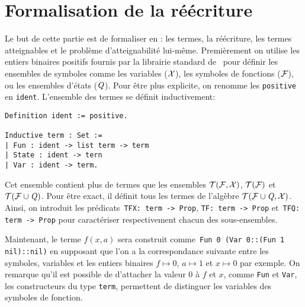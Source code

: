 \section{Formalisation de la réécriture}
\label{sec:rewriting}

Le but de cette partie est de formaliser en \coq: les termes, la
réécriture, les termes atteignables et le problème d'atteignabilité
lui-même.  Premièrement on utilise les entiers binaires positifs
fournis par la librairie standard de \coq\ pour définir les ensembles de
symboles comme les variables ($\mathcal X$), les symboles de fonctions
($\mathcal{F}$), ou les ensembles d'états ($\mathit Q$). 
Pour être plus explicite, on renomme les \lstinline!positive!
en \lstinline!ident!. L'ensemble des termes se définit inductivement:

\switchlstcoq
\begin{lstlisting}
Definition ident := positive.

Inductive term : Set :=
| Fun : ident -> list term -> term
| State : ident -> tern
| Var : ident -> term.
\end{lstlisting}

Cet ensemble contient plus de termes que les ensembles $\mathcal{T(F, X)}$, $\mathcal{T(F)}$ et $\mathcal{ T(F \cup \mathit Q)}$.
Pour être exact, il définit tous les termes de l'algèbre $\mathcal{ T(F \cup \mathit Q, X)}$.
Ainsi, on introduit les prédicats~\lstinline!TFX: term -> Prop!, \lstinline!TF: term -> Prop!
et~\lstinline!TFQ: term -> Prop! pour caractériser respectivement chacun des sous-ensembles.

Maintenant, le terme $f(x, a)$ sera construit comme~\lstinline!Fun 0 (Var 0::(Fun 1 nil)::nil)!
en supposant que l'on a la correspondance suivante entre les symboles,
variables et les entiers binaires $f \mapsto 0$, $a \mapsto 1$ et $x
\mapsto 0$ par exemple.  On remarque qu'il est possible de d'attacher
la valeur $0$ à $f$ et $x$, comme \lstinline!Fun! et \lstinline!Var!,
les constructeurs du type \lstinline!term!, permettent de distinguer
les variables des symboles de fonction.

